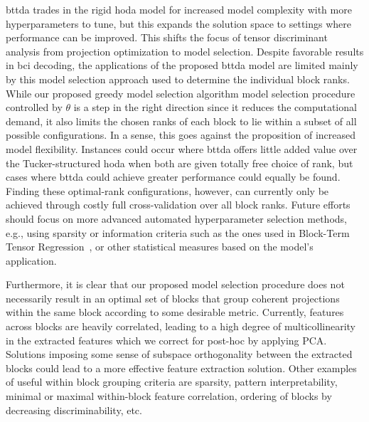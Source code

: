 \documentclass[twocolumn]{article}
\begin{document}
	\Ac{bttda} trades in the rigid \ac{hoda} model for increased model complexity with more
	hyperparameters to tune, but this expands the solution space to settings where performance can be
	improved.
	This shifts the focus of tensor discriminant analysis from projection
	optimization to model selection.
	Despite favorable results in \ac{bci} decoding, the applications of the proposed
	\ac{bttda} model are limited mainly by this model selection approach used
	to determine the individual block ranks.
	While our proposed greedy model selection algorithm model selection procedure controlled by $\theta$
is a step in the right direction since it reduces the computational demand, it
also limits the chosen ranks of each block to lie within a subset of all possible configurations.
In a sense, this goes against the proposition of increased model flexibility.
Instances could occur where \ac{bttda} offers little added value over the
Tucker-structured \ac{hoda} when both are given totally free choice of rank, but cases where \ac{bttda} could achieve greater performance could equally be found.
Finding these optimal-rank configurations, however, can currently only be achieved through costly full cross-validation over all block ranks.
Future efforts should focus on more advanced automated hyperparameter selection methods, e.g., using sparsity
or information criteria such as the ones used in Block-Term Tensor
Regression~\cite{Faes2022}, or other statistical measures based on the model's
application.

Furthermore, it is clear that our proposed model selection procedure does not
necessarily result in an optimal set of blocks that group coherent projections
within the same block according to some desirable metric.
Currently, features across blocks are heavily correlated, leading to a high
degree of multicollinearity in the extracted features which we correct for post-hoc
by applying PCA.
Solutions imposing some sense of subspace orthogonality between the extracted blocks
could lead to a more effective feature extraction solution.
Other examples of useful within block grouping criteria are sparsity,
pattern interpretability, minimal or maximal within-block feature correlation,
ordering of blocks by decreasing discriminability, etc.
\end{document}
